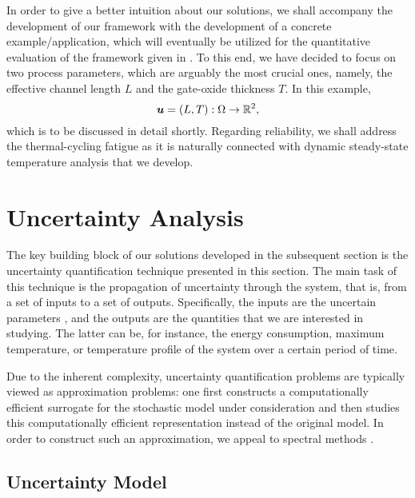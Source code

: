 In order to give a better intuition about our solutions, we shall accompany the
development of our framework with the development of a concrete
example/application, which will eventually be utilized for the quantitative
evaluation of the framework given in . To this end,
we have decided to focus on two process parameters, which are arguably the most
crucial ones, namely, the effective channel length $L$ and the gate-oxide
thickness $T$. In this example,
\[
  \boldsymbol{u} = (L, T): \Omega \to \mathbb{R}^2,
\]
which is to be discussed in detail shortly. Regarding reliability, we shall
address the thermal-cycling fatigue as it is naturally connected with dynamic
steady-state temperature analysis that we develop.

\section{Uncertainty Analysis}

The key building block of our solutions developed in the subsequent section is
the uncertainty quantification technique presented in this section. The main
task of this technique is the propagation of uncertainty through the system,
that is, from a set of inputs to a set of outputs. Specifically, the inputs are
the uncertain parameters \vu, and the outputs are the quantities that we are
interested in studying. The latter can be, for instance, the energy consumption,
maximum temperature, or temperature profile of the system over a certain period
of time.

Due to the inherent complexity, uncertainty quantification problems are
typically viewed as approximation problems: one first constructs a
computationally efficient surrogate for the stochastic model under consideration
and then studies this computationally efficient representation instead of the
original model. In order to construct such an approximation, we appeal to
spectral methods \cite{maitre2010, janson1997, eldred2008}.

\subsection{Uncertainty Model}

